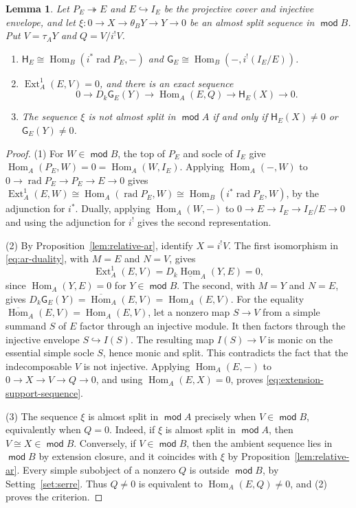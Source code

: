\documentclass[a4paper,reqno,10pt]{amsart}
\newtheorem{lemma}[theorem]{Lemma}
\theoremstyle{definition}
\numberwithin{equation}{section}
\DeclareMathOperator{\moduleCategory}{\mathsf{mod}}
\renewcommand{\mod}{\moduleCategory}
\DeclareMathOperator{\Hom}{Hom}
\DeclareMathOperator{\Ext}{Ext}
\DeclareMathOperator{\rad}{rad}
\newcommand{\Dk}{D_k}
\newcommand{\uhom}{\underline{\Hom}}
\newcommand{\ohom}{\overline{\Hom}}
\begin{document}
\begin{lemma}\label{lem:extension-supports}
Let \(P_E\twoheadrightarrow E\) and \(E\hookrightarrow I_E\) be the
projective cover and injective envelope, and let
\(\xi:0\to X\to\theta_B Y\to Y\to0\) be an almost split sequence in
\(\mod B\).
Put \(V=\tau_A Y\) and \(Q=V/i^!V\).
\begin{enumerate}
\item \(\mathsf H_E\cong\Hom_B(i^*\rad P_E,-)\) and
\(\mathsf G_E\cong\Hom_B(-,i^!(I_E/E))\).
\item \(\Ext_A^1(E,V)=0\), and there is an exact sequence
\begin{equation}\label{eq:extension-support-sequence}
 0\longrightarrow\Dk \mathsf G_E(Y)\longrightarrow\Hom_A(E,Q)
 \longrightarrow \mathsf H_E(X)\longrightarrow0.
\end{equation}
\item The sequence \(\xi\) is not almost split in \(\mod A\) if and only
if \(\mathsf H_E(X)\ne0\) or \(\mathsf G_E(Y)\ne0\).
\end{enumerate}
\end{lemma}
\begin{proof}
(1) For \(W\in\mod B\), the top of \(P_E\) and socle of \(I_E\) give
\(\Hom_A(P_E,W)=0=\Hom_A(W,I_E)\). Applying \(\Hom_A(-,W)\) to
\(0\to\rad P_E\to P_E\to E\to0\) gives
\(\Ext_A^1(E,W)\cong\Hom_A(\rad P_E,W)\cong\Hom_B(i^*\rad P_E,W)\), by the
adjunction for \(i^*\). Dually, applying \(\Hom_A(W,-)\) to
\(0\to E\to I_E\to I_E/E\to0\) and using the adjunction for \(i^!\) gives
the second representation.

(2) By Proposition~\ref{lem:relative-ar}, identify \(X=i^!V\).
The first isomorphism in \eqref{eq:ar-duality}, with \(M=E\) and \(N=V\),
gives
\[
 \Ext_A^1(E,V)=\Dk\uhom_A(Y,E)=0,
\]
since \(\Hom_A(Y,E)=0\) for \(Y\in\mod B\).
The second, with \(M=Y\) and \(N=E\), gives
\(\Dk \mathsf G_E(Y)=\ohom_A(E,V)=\Hom_A(E,V)\).
For the equality \(\ohom_A(E,V)=\Hom_A(E,V)\), let a nonzero map
\(S\to V\) from a simple summand \(S\) of \(E\) factor through an
injective module. It then factors through the injective envelope
\(S\hookrightarrow I(S)\). The resulting map \(I(S)\to V\) is monic on the
essential simple socle \(S\),
hence monic and split. This contradicts the fact that the
indecomposable \(V\) is not injective. Applying \(\Hom_A(E,-)\) to
\(0\to X\to V\to Q\to0\), and using \(\Hom_A(E,X)=0\), proves
\eqref{eq:extension-support-sequence}.

(3) The sequence \(\xi\) is almost split in \(\mod A\) precisely when
\(V\in\mod B\), equivalently when \(Q=0\). Indeed, if \(\xi\) is almost
split in \(\mod A\), then \(V\cong X\in\mod B\). Conversely, if
\(V\in\mod B\), then the ambient sequence lies in \(\mod B\) by extension
closure, and it coincides with \(\xi\) by
Proposition~\ref{lem:relative-ar}. Every simple subobject of a nonzero \(Q\)
is outside \(\mod B\), by Setting~\ref{set:serre}.
Thus \(Q\ne0\) is equivalent to \(\Hom_A(E,Q)\ne0\), and (2) proves the
criterion.
\end{proof}
\end{document}
